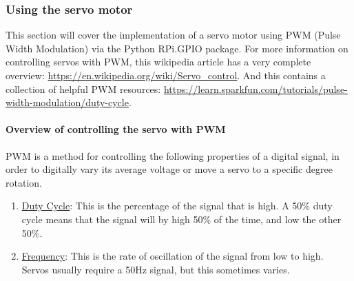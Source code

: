 \documentclass{article}
\begin{document}
  \subsubsection{Using the servo motor}
  This section will cover the implementation of a servo motor using PWM (Pulse Width Modulation) via the Python RPi.GPIO package. For more information on controlling servos with PWM, this wikipedia article has a very complete overview: \href{https://en.wikipedia.org/wiki/Servo\_control}{https://en.wikipedia.org/wiki/Servo\_control}. And this contains a collection of helpful PWM resources: \href{https://learn.sparkfun.com/tutorials/pulse-width-modulation/duty-cycle}{https://learn.sparkfun.com/tutorials/pulse-width-modulation/duty-cycle}.

    \paragraph{Overview of controlling the servo with PWM}
    PWM is a method for controlling the following properties of a digital signal, in order to digitally vary its average voltage or move a servo to a specific degree rotation.
    \begin{enumerate}
      \item \underline{Duty Cycle}: This is the percentage of the signal that is high. A 50\% duty cycle means that the signal will by high 50\% of the time, and low the other 50\%.
      \item \underline{Frequency}: This is the rate of oscillation of the signal from low to high. Servos usually require a 50Hz signal, but this sometimes varies.
    \end{enumerate}
\end{document}
